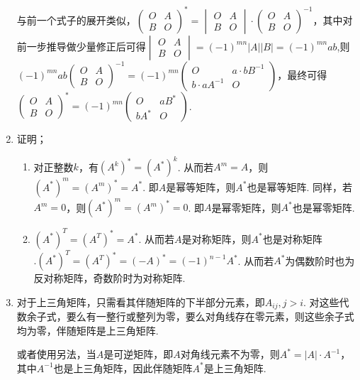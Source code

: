 \begin{enumerate}
          与前一个式子的展开类似，$\begin{pmatrix}
                  O & A \\ B & O
              \end{pmatrix}^*=\begin{vmatrix}
                  O & A \\ B & O
              \end{vmatrix}\cdot \begin{pmatrix}
                  O & A \\ B & O
              \end{pmatrix}^{-1}$，其中对前一步推导做少量修正后可得$\begin{vmatrix}
                  O & A \\ B & O
              \end{vmatrix}=(-1)^{mn}|A||B|=(-1)^{mn}ab$,则$(-1)^{mn}ab\begin{pmatrix}
                  O & A \\ B & O
              \end{pmatrix}^{-1}=(-1)^{mn}\begin{pmatrix}
                  O & a\cdot bB^{-1} \\ b\cdot aA^{-1} & O
              \end{pmatrix}$，最终可得$\begin{pmatrix}
                  O & A \\ B & O
              \end{pmatrix}^*=(-1)^{mn}\begin{pmatrix}
                  O & aB^* \\ bA^* & O
              \end{pmatrix}$.

    \item 证明；\begin{enumerate}
              \item 对正整数$k$，有$(A^k)^*=(A^*)^k$. 从而若$A^m=A$，则$(A^*)^m=(A^m)^*=A^*$. 即$A$是幂等矩阵，则$A^*$也是幂等矩阵. 同样，若$A^m=0$，则$(A^*)^m=(A^m)^*=0$. 即$A$是幂零矩阵，则$A^*$也是幂零矩阵.

              \item $(A^*)^T=(A^T)^*=A^*$. 从而若$A$是对称矩阵，则$A^*$也是对称矩阵$. (A^*)^T=(A^T)^*=(-A)^*=(-1)^{n-1}A^*$. 从而若$A^*$为偶数阶时也为反对称矩阵，奇数阶时为对称矩阵.
          \end{enumerate}

    \item 对于上三角矩阵，只需看其伴随矩阵的下半部分元素，即$A_{ij},j>i$. 对这些代数余子式，要么有一整行或整列为零，要么对角线存在零元素，则这些余子式均为零，伴随矩阵是上三角矩阵.\par 或者使用另法，当$A$是可逆矩阵，即$A$对角线元素不为零，则$A^*=|A|\cdot A^{-1}$，其中$A^{-1}$也是上三角矩阵，因此伴随矩阵$A^*$是上三角矩阵.


\end{enumerate}
